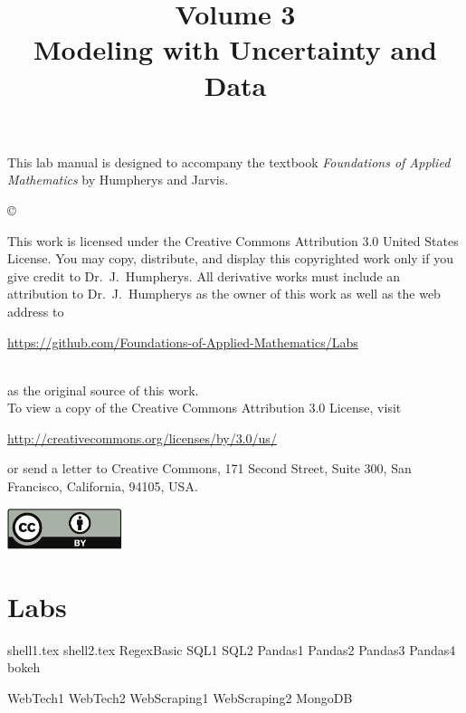 \documentclass[opener-c,labs,yellow,nociteref]{HJnewsiambook}
\title{Volume 3\\ Modeling with Uncertainty and Data}
\begin{document}

\thispagestyle{empty} %
\maketitle
\thispagestyle{empty}
\frontmatter


\begin{thepreface} %

This lab manual is designed to accompany the textbook \emph{Foundations of Applied Mathematics} by Humpherys and Jarvis.

\vfill
\copyright{This work is licensed under the Creative Commons Attribution 3.0 United States
License.  You may copy, distribute, and display this copyrighted work only if you give
credit to Dr.~J.~Humpherys. All derivative works must include an attribution to Dr.~J.~Humpherys as the owner of this work as well as the web address to
\\\centerline{\url{https://github.com/Foundations-of-Applied-Mathematics/Labs}}\\as the original source of this work.
\\To view a copy of the Creative Commons Attribution 3.0 License, visit
\\\centerline{\url{http://creativecommons.org/licenses/by/3.0/us/}} or send a letter to Creative Commons, 171 Second Street, Suite 300, San Francisco, California, 94105, USA.}

\vfill
\centering\includegraphics[height=1.2cm]{by.pdf}
\vfill
\end{thepreface}

\setcounter{tocdepth}{1}
\tableofcontents

\mainmatter %

\part{Labs} %
{shell1.tex}
{shell2.tex}
{RegexBasic}
{SQL1}
{SQL2}
{Pandas1}
{Pandas2}
{Pandas3}
{Pandas4}
{bokeh}

{WebTech1}
{WebTech2}
{WebScraping1}
{WebScraping2}
{MongoDB}
\end{document}
